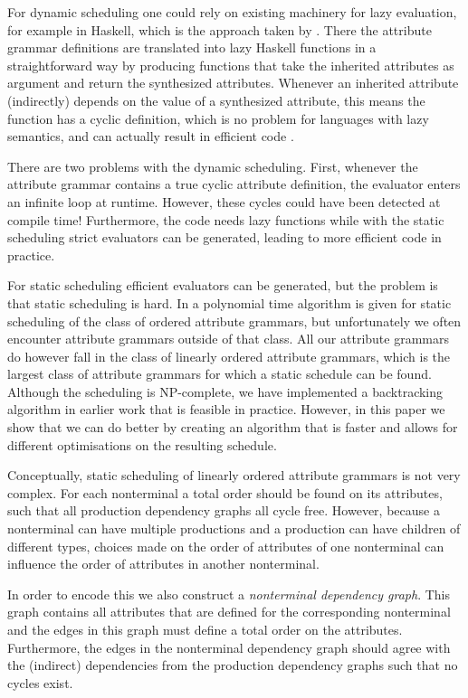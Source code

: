 \documentclass{llncs}
\begin{document}
For dynamic scheduling one could rely on existing machinery for lazy evaluation, for example in Haskell, which is the approach taken by \cite{saraiva99}. There the attribute grammar definitions are translated into lazy Haskell functions in a straightforward way by producing functions that take the inherited attributes as argument and return the synthesized attributes. Whenever an inherited attribute (indirectly) depends on the value of a synthesized attribute, this means the function has a cyclic definition, which is no problem for languages with lazy semantics, and can actually result in efficient code \cite{Bird:1984}.

There are two problems with the dynamic scheduling. First, whenever the attribute grammar contains a true cyclic attribute definition, the evaluator enters an infinite loop at runtime. However, these cycles could have been detected at compile time! Furthermore, the code needs lazy functions while with the static scheduling strict evaluators can be generated, leading to more efficient code in practice.

For static scheduling efficient evaluators can be generated, but the problem is that static scheduling is hard. In \cite{kastens80} a polynomial time algorithm is given for static scheduling of the class of ordered attribute grammars, but unfortunately we often encounter attribute grammars outside of that class. All our attribute grammars do however fall in the class of linearly ordered attribute grammars, which is the largest class of attribute grammars for which a static schedule can be found. Although the scheduling is NP-complete, we have implemented a backtracking algorithm in earlier work \cite{Binsbergen:2015} that is feasible in practice. However, in this paper we show that we can do better by creating an algorithm that is faster and allows for different optimisations on the resulting schedule.

Conceptually, static scheduling of linearly ordered attribute grammars is not very complex. For each nonterminal a total order should be found on its attributes, such that all production dependency graphs all cycle free. However, because a nonterminal can have multiple productions and a production can have children of different types, choices made on the order of attributes of one nonterminal can influence the order of attributes in another nonterminal.

In order to encode this we also construct a \emph{nonterminal dependency graph}. This graph contains all attributes that are defined for the corresponding nonterminal and the edges in this graph must define a total order on the attributes. Furthermore, the edges in the nonterminal dependency graph should agree with the (indirect) dependencies from the production dependency graphs such that no cycles exist.
\end{document}
